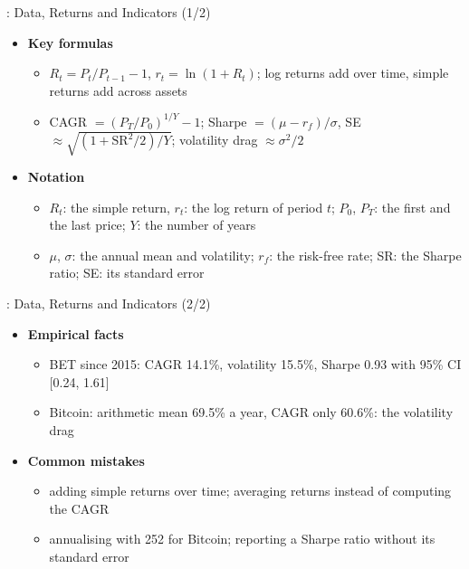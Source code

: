 \begin{frame}{: Data, Returns and Indicators (1/2)}
\itemsize{\small}
\begin{itemize}
    \item \textbf{Key formulas}
    \begin{itemize}
        \item $R_t = P_t/P_{t-1} - 1$, $r_t = \ln(1 + R_t)$; log returns add over time, simple returns add across assets
        \item CAGR $= (P_T/P_0)^{1/Y} - 1$; Sharpe $= (\mu - r_f)/\sigma$, SE $\approx \sqrt{(1 + \mathrm{SR}^2/2)/Y}$; volatility drag $\approx \sigma^2/2$
    \end{itemize}
    \item \textbf{Notation}
    \begin{itemize}
        \item $R_t$: the simple return, $r_t$: the log return of period $t$; $P_0$, $P_T$: the first and the last price; $Y$: the number of years
        \item $\mu$, $\sigma$: the annual mean and volatility; $r_f$: the risk-free rate; SR: the Sharpe ratio; SE: its standard error
    \end{itemize}
\end{itemize}
\end{frame}

\begin{frame}{: Data, Returns and Indicators (2/2)}
\itemsize{\small}
\begin{itemize}
    \item \textbf{Empirical facts}
    \begin{itemize}
        \item BET since 2015: CAGR 14.1\%, volatility 15.5\%, Sharpe 0.93 with 95\% CI [0.24, 1.61]
        \item Bitcoin: arithmetic mean 69.5\% a year, CAGR only 60.6\%: the volatility drag
    \end{itemize}
    \item \textbf{Common mistakes}
    \begin{itemize}
        \item adding simple returns over time; averaging returns instead of computing the CAGR
        \item annualising with 252 for Bitcoin; reporting a Sharpe ratio without its standard error
    \end{itemize}
\end{itemize}
\end{frame}

